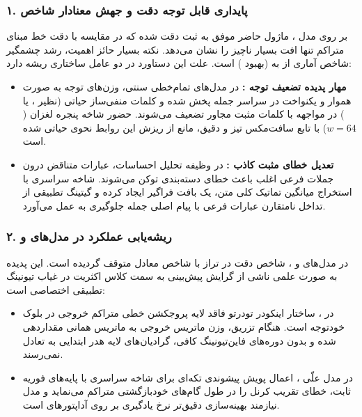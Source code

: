 \subsubsection*{۱. پایداری قابل توجه دقت و جهش معنادار شاخص }
بر روی مدل ، ماژول حاضر موفق به ثبت دقت  شده که در مقایسه با دقت خط مبنای متراکم  تنها افت بسیار ناچیز  را نشان می‌دهد. نکته بسیار حائز اهمیت، رشد چشمگیر شاخص آماری  از  به  (بهبود ) است. علت این دستاورد در دو عامل ساختاری ریشه دارد:
\begin{itemize}
    \item \textbf{مهار پدیده تضعیف توجه :} در مدل‌های تمام‌خطی سنتی، وزن‌های توجه به صورت هموار و یکنواخت در سراسر جمله پخش شده و کلمات منفی‌ساز حیاتی (نظیر ،  یا ) در مواجهه با کلمات مثبت مجاور تضعیف می‌شوند. حضور شاخه پنجره لغزان ($w=64$) با تابع سافت‌مکس تیز و دقیق، مانع از ریزش این روابط نحوی حیاتی شده است.
    \item \textbf{تعدیل خطای مثبت کاذب :} در وظیفه تحلیل احساسات، عبارات متناقض درون جملات فرعی اغلب باعث خطای دسته‌بندی توکن \lr{[CLS]} می‌شوند. شاخه سراسری  با استخراج میانگین تماتیک کلی متن، یک بافت فراگیر ایجاد کرده و گیتینگ تطبیقی از تداخل نامتقارن عبارات فرعی با پیام اصلی جمله جلوگیری به عمل می‌آورد.
\end{itemize}

\subsubsection*{۲. ریشه‌یابی عملکرد در مدل‌های  و }
در مدل‌های  و ، شاخص دقت در تراز  با شاخص  معادل  متوقف گردیده است. این پدیده به صورت علمی ناشی از گرایش پیش‌بینی به سمت کلاس اکثریت در غیاب تیونینگ تطبیقی اختصاصی است:
\begin{itemize}
    \item در ، ساختار اینکودر تودرتو فاقد لایه پروجکشن خطی متراکم خروجی در بلوک خودتوجه است. هنگام تزریق، وزن ماتریس خروجی به ماتریس همانی مقداردهی شده و بدون دوره‌های فاین‌تیونینگ کافی، گرادیان‌های لایه هدر ابتدایی به تعادل نمی‌رسند.
    \item در مدل علّی ، اعمال پویش پیشوندی تکه‌ای برای شاخه سراسری با پایه‌های فوریه ثابت، خطای تقریب کرنل را در طول گام‌های خودبازگشتی متراکم می‌نماید و مدل نیازمند بهینه‌سازی دقیق‌تر نرخ یادگیری بر روی آداپتورهای  است.
\end{itemize}

